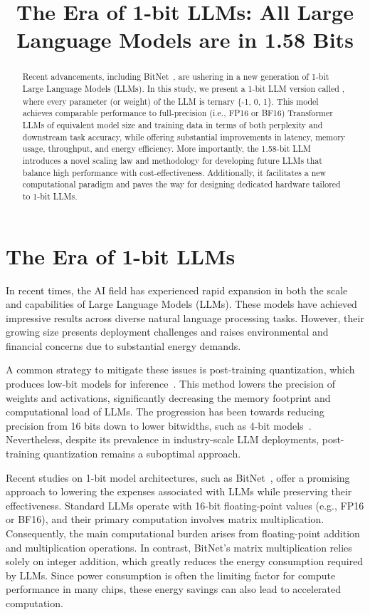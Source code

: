 \title{The Era of 1-bit LLMs: All Large Language Models are in 1.58 Bits}

\begin{abstract}
Recent advancements, including BitNet~\cite{bitnet}, are ushering in a new generation of 1-bit Large Language Models (LLMs). In this study, we present a 1-bit LLM version called \textbf{}, where every parameter (or weight) of the LLM is ternary \{-1, 0, 1\}. This model achieves comparable performance to full-precision (i.e., FP16 or BF16) Transformer LLMs of equivalent model size and training data in terms of both perplexity and downstream task accuracy, while offering substantial improvements in latency, memory usage, throughput, and energy efficiency. More importantly, the 1.58-bit LLM introduces a novel scaling law and methodology for developing future LLMs that balance high performance with cost-effectiveness. Additionally, it facilitates a new computational paradigm and paves the way for designing dedicated hardware tailored to 1-bit LLMs.
\end{abstract}

\section{The Era of 1-bit LLMs}

In recent times, the AI field has experienced rapid expansion in both the scale and capabilities of Large Language Models (LLMs). These models have achieved impressive results across diverse natural language processing tasks. However, their growing size presents deployment challenges and raises environmental and financial concerns due to substantial energy demands.

A common strategy to mitigate these issues is post-training quantization, which produces low-bit models for inference~\cite{smoothquant, gptq, quip, quip_sharp}. This method lowers the precision of weights and activations, significantly decreasing the memory footprint and computational load of LLMs. The progression has been towards reducing precision from 16 bits down to lower bitwidths, such as 4-bit models~\cite{gptq, awq}. Nevertheless, despite its prevalence in industry-scale LLM deployments, post-training quantization remains a suboptimal approach.

Recent studies on 1-bit model architectures, such as BitNet~\cite{bitnet}, offer a promising approach to lowering the expenses associated with LLMs while preserving their effectiveness. Standard LLMs operate with 16-bit floating-point values (e.g., FP16 or BF16), and their primary computation involves matrix multiplication. Consequently, the main computational burden arises from floating-point addition and multiplication operations. In contrast, BitNet’s matrix multiplication relies solely on integer addition, which greatly reduces the energy consumption required by LLMs. Since power consumption is often the limiting factor for compute performance in many chips, these energy savings can also lead to accelerated computation.

